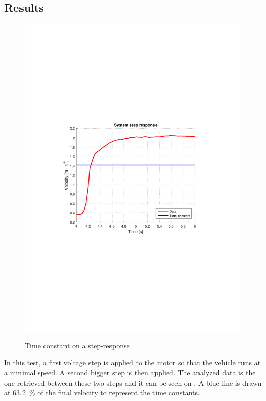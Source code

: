 \subsection{Results} \label{inertiaTestResults}

\begin{figure}[H]
  \centering
  {
    \includegraphics[width=1.0\textwidth]{figures/systemTimeConstant.pdf}
  }
  \caption{Time constant on a step-response}
  \label{fig:systemTimeConstant}
\end{figure}\vspace{-5mm}
%
In this test, a first voltage step is applied to the motor so that the vehicle runs at a minimal speed. A second bigger step is then applied. The analyzed data is the one retrieved between these two steps and it can be seen on . A blue line is drawn at \si{\num{63,2} \%} of the final velocity to represent the time constants.


